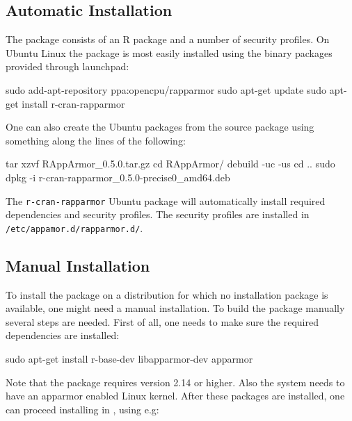 \documentclass[article]{jss}
\begin{document}
\subsection{Automatic Installation}

The  package consists of an R package and a number of security
profiles. On Ubuntu Linux the package is most easily installed using the binary
packages provided through launchpad:

\begin{CodeChunk}
\begin{CodeInput}
sudo add-apt-repository ppa:opencpu/rapparmor
sudo apt-get update
sudo apt-get install r-cran-rapparmor
\end{CodeInput}
\end{CodeChunk}

One can also create the Ubuntu packages from the source  package
using something along the lines of the following:

\begin{CodeChunk}
\begin{CodeInput}
tar xzvf RAppArmor_0.5.0.tar.gz
cd RAppArmor/
debuild -uc -us
cd ..
sudo dpkg -i r-cran-rapparmor_0.5.0-precise0_amd64.deb
\end{CodeInput}
\end{CodeChunk}

The \texttt{r-cran-rapparmor} Ubuntu package will automatically install required
dependencies and security profiles. The security profiles are installed in
\texttt{/etc/appamor.d/rapparmor.d/}. 

\subsection{Manual Installation}

To install the package on a distribution for which no installation package is
available, one might need a manual installation. To build the package manually
several steps are needed. First of all, one needs to make sure the required
dependencies are installed:

\begin{CodeChunk}
\begin{CodeInput}
sudo apt-get install r-base-dev libapparmor-dev apparmor
\end{CodeInput}
\end{CodeChunk}

Note that the package requires  version 2.14 or higher. Also the
system needs to have an apparmor enabled Linux kernel. After these packages are
installed, one can proceed installing  in , using
e.g:
\end{document}
